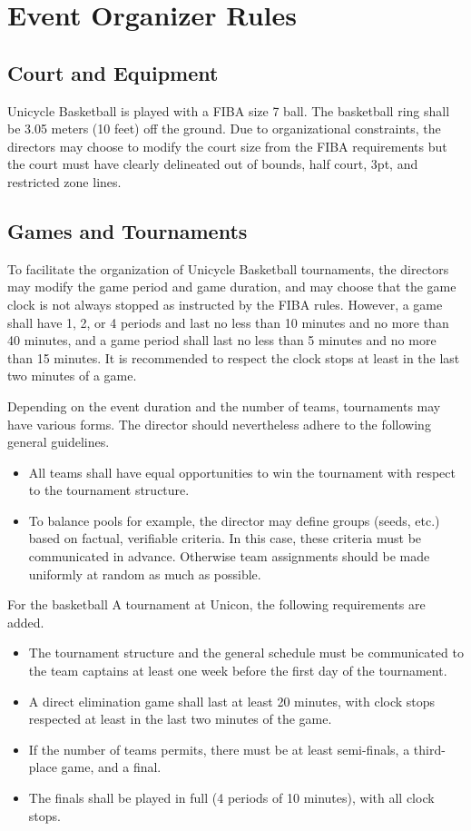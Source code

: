 \chapter{Event Organizer Rules}

\section{Court and Equipment}

Unicycle Basketball is played with a FIBA size 7 ball. The basketball ring shall be 3.05 meters (10 feet) off the ground. 
Due to organizational constraints, the directors may choose to modify the court size from the FIBA requirements 
but the court must have clearly delineated out of bounds, half court, 3pt, and restricted zone lines.

\section{Games and Tournaments}

To facilitate the organization of Unicycle Basketball tournaments, the directors may modify the game period and game duration, 
and may choose that the game clock is not always stopped as instructed by the FIBA rules. 
However, a game shall have 1, 2, or 4 periods and last no less than 10 minutes and no more than 40 minutes, 
and a game period shall last no less than 5 minutes and no more than 15 minutes. 
It is recommended to respect the clock stops at least in the last two minutes of a game.

Depending on the event duration and the number of teams, tournaments may have various forms. 
The director should nevertheless adhere to the following general guidelines.

\begin{itemize}
  \item All teams shall have equal opportunities to win the tournament with respect to the tournament structure.
  \item To balance pools for example, the director may define groups (seeds, etc.) based on factual, verifiable criteria. 
    In this case, these criteria must be communicated in advance. 
    Otherwise team assignments should be made uniformly at random as much as possible.
\end{itemize}

For the basketball A tournament at Unicon, the following requirements are added.

\begin{itemize}
  \item The tournament structure and the general schedule must be communicated to the team captains at least one week 
    before the first day of the tournament.
  \item A direct elimination game shall last at least 20 minutes, with clock stops respected at least in the last 
    two minutes of the game.
  \item If the number of teams permits, there must be at least semi-finals, a third-place game, and a final.
  \item The finals shall be played in full (4 periods of 10 minutes), with all clock stops.
\end{itemize}